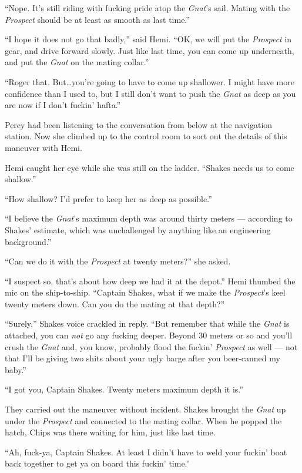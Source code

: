 \documentclass[
]{scrbook}
\begin{document}
``Nope. It's still riding with fucking pride atop the \emph{Gnat}'s
sail. Mating with the \emph{Prospect} should be at least as smooth as
last time.''

``I hope it does not go that badly,'' said Hemi. ``OK, we will put the
\emph{Prospect} in gear, and drive forward slowly. Just like last time,
you can come up underneath, and put the \emph{Gnat} on the mating
collar.''

``Roger that. But\ldots you're going to have to come up shallower. I
might have more confidence than I used to, but I still don't want to
push the \emph{Gnat} as deep as you are now if I don't fuckin' hafta.''

Percy had been listening to the conversation from below at the
navigation station. Now she climbed up to the control room to sort out
the details of this maneuver with Hemi.

Hemi caught her eye while she was still on the ladder. ``Shakes needs us
to come shallow.''

``How shallow? I'd prefer to keep her as deep as possible.''

``I believe the \emph{Gnat}'s maximum depth was around thirty meters ---
according to Shakes' estimate, which was unchallenged by anything like
an engineering background.''

``Can we do it with the \emph{Prospect} at twenty meters?'' she asked.

``I suspect so, that's about how deep we had it at the depot.'' Hemi
thumbed the mic on the ship-to-ship. ``Captain Shakes, what if we make
the \emph{Prospect}'s keel twenty meters down. Can you do the mating at
that depth?''

``Surely,'' Shakes voice crackled in reply. ``But remember that while
the \emph{Gnat} is attached, you can \emph{not} go any fucking deeper.
Beyond 30 meters or so and you'll crush the \emph{Gnat} and, you know,
probably flood the fuckin' \emph{Prospect} as well --- not that I'll be
giving two shits about your ugly barge after you beer-canned my baby.''

``I got you, Captain Shakes. Twenty meters maximum depth it is.''

They carried out the maneuver without incident. Shakes brought the
\emph{Gnat} up under the \emph{Prospect} and connected to the mating
collar. When he popped the hatch, Chips was there waiting for him, just
like last time.

``Ah, fuck-ya, Captain Shakes. At least I didn't have to weld your
fuckin' boat back together to get ya on board this fuckin' time.''
\end{document}
